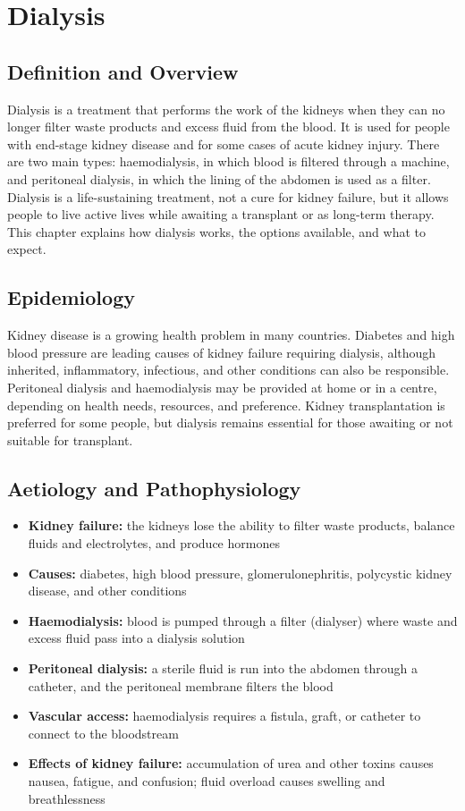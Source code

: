 \chapter{Dialysis}

\section*{Definition and Overview}
Dialysis is a treatment that performs the work of the kidneys when they can no longer filter waste products and excess fluid from the blood. It is used for people with end-stage kidney disease and for some cases of acute kidney injury. There are two main types: haemodialysis, in which blood is filtered through a machine, and peritoneal dialysis, in which the lining of the abdomen is used as a filter. Dialysis is a life-sustaining treatment, not a cure for kidney failure, but it allows people to live active lives while awaiting a transplant or as long-term therapy. This chapter explains how dialysis works, the options available, and what to expect.

\section*{Epidemiology}
Kidney disease is a growing health problem in many countries. Diabetes and high blood pressure are leading causes of kidney failure requiring dialysis, although inherited, inflammatory, infectious, and other conditions can also be responsible. Peritoneal dialysis and haemodialysis may be provided at home or in a centre, depending on health needs, resources, and preference. Kidney transplantation is preferred for some people, but dialysis remains essential for those awaiting or not suitable for transplant.

\section*{Aetiology and Pathophysiology}
\begin{itemize}
    \item \textbf{Kidney failure:} the kidneys lose the ability to filter waste products, balance fluids and electrolytes, and produce hormones
    \item \textbf{Causes:} diabetes, high blood pressure, glomerulonephritis, polycystic kidney disease, and other conditions
    \item \textbf{Haemodialysis:} blood is pumped through a filter (dialyser) where waste and excess fluid pass into a dialysis solution
    \item \textbf{Peritoneal dialysis:} a sterile fluid is run into the abdomen through a catheter, and the peritoneal membrane filters the blood
    \item \textbf{Vascular access:} haemodialysis requires a fistula, graft, or catheter to connect to the bloodstream
    \item \textbf{Effects of kidney failure:} accumulation of urea and other toxins causes nausea, fatigue, and confusion; fluid overload causes swelling and breathlessness
\end{itemize}

